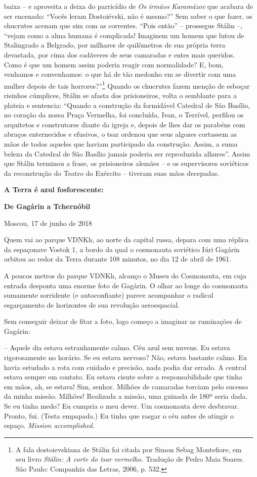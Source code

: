 baixa -- e aproveita a deixa do parricídio de \emph{Os irmãos Karamázov}
que acabara de ser encenado: ``Vocês leram Dostoiévski, não é mesmo?''
Sem saber o que fazer, os chucrutes acenam que sim com as correntes.
``Pois então'' -- prossegue Stálin --, ``vejam como a alma humana é
complicada! Imaginem um homem que lutou de Stalingrado a Belgrado, por
milhares de quilômetros de sua própria terra devastada, por cima dos
cadáveres de seus camaradas e entes mais queridos. Como é que um homem
assim poderia reagir com normalidade? E, bom, venhamos e convenhamos: o
que há de tão medonho em se divertir com uma mulher depois de tais
horrores?''\footnote{A fala dostoievskiana de Stálin foi citada por
  Simon Sebag Montefiore, em seu livro \emph{Stálin: A corte do tsar
  vermelho.} Tradução de Pedro Maia Soares. São Paulo: Companhia das
  Letras, 2006, p. 532.} Quando os chucrutes fazem menção de esboçar
risinhos cúmplices, Stálin se afasta dos prisioneiros, volta o semblante
para a plateia e sentencia: ``Quando a construção da formidável Catedral
de São Basílio, no coração da nossa Praça Vermelha, foi concluída, Ivan,
o Terrível, perfilou os arquitetos e construtores diante da igreja e,
depois de lhes dar os parabéns com abraços enternecidos e efusivos, o
tsar ordenou que seus algozes cortassem as mãos de todos aqueles que
haviam participado da construção. Assim, a suma beleza da Catedral de
São Basílio jamais poderia ser reproduzida alhures''. Assim que Stálin
terminou a frase, os prisioneiros alemães -- e os supervisores
soviéticos da reconstrução do Teatro do Exército -- tiveram suas mãos
decepadas.

\textbf{A Terra é azul fosforescente: }

\textbf{De Gagárin a Tchernóbil}

Moscou, 17 de junho de 2018

Quem vai ao parque VDNKh, ao norte da capital russa, depara com uma
réplica da espaçonave Vostok 1, a bordo da qual o cosmonauta soviético
Iúri Gagárin orbitou ao redor da Terra durante 108 minutos, no dia 12 de
abril de 1961.

A poucos metros do parque VDNKh, alcanço o Museu do Cosmonauta, em cuja
entrada desponta uma enorme foto de Gagárin. O olhar ao longe do
cosmonauta sumamente sorridente (e autoconfiante) parece acompanhar o
radical esgarçamento de horizontes de sua revolução aeroespacial.

Sem conseguir deixar de fitar a foto, logo começo a imaginar as
ruminações de Gagárin:

-- Aquele dia estava estranhamente calmo. Céu azul sem nuvens. Eu estava
rigorosamente no horário. Se eu estava nervoso? Não, estava bastante
calmo. Eu havia estudado a rota com cuidado e precisão, nada podia dar
errado. A central estava sempre em contato. Eu estava ciente sobre a
responsabilidade que tinha em mãos, ah, se estava! Sim, senhor. Milhões
de camaradas torciam pelo sucesso da minha missão. Milhões! Realizada a
missão, uma guinada de 180º seria dada. Se eu tinha medo? Eu cumpria o
meu dever. Um cosmonauta deve desbravar. Pronto, fui. (Testa empapada.)
Eu tinha que rasgar o céu antes de atingir o espaço. \emph{Mission
accomplished}.

